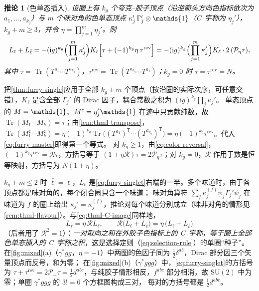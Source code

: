 \documentclass[UTF8,a4paper,11pt,fontset=fandol]{ctexart}
\makeatletter
\let\amsmathbb\mathbb
\renewcommand{\mathbb}[1]{\ifx1#1\mathds{1}\else\amsmathbb{#1}\fi}
\theoremstyle{cplain}
\newtheorem{corollary}[theorem]{推论}
\theoremstyle{cdefinition}
\theoremstyle{cremark}
\renewcommand{\proofname}{证明}
\renewenvironment{proof}[1][\proofname]{\par\pushQED{\qed}\normalfont\topsep6\p@\@plus6\p@\relax
  \trivlist\item[\hskip\labelsep\itshape #1\hspace{0.5em}]\ignorespaces}{\popQED\endtrivlist\@endpefalse}
\numberwithin{equation}{section}
\DeclareMathOperator{\Tr}{Tr}
\newcommand{\tp}{\mathsf{T}}                         %
\newcommand{\Rop}{\mathcal{R}}                       %
\newcommand{\Pm}{\mathcal{P}_{-}}                    %
\newcommand{\ii}{\mathrm{i}}                        %
\makeatother
\begin{document}
\begin{corollary}[色单态插入]\label{cor:singlet}
设圈上有 $k_g$ 个夸克--胶子顶点（沿逆箭头方向色指标依次为 $a_1,\dots,a_{k_g}$）与 $m$ 个味对角的色单态顶点
$\kappa_j'\,\Gamma_j'\otimes\mathbb 1$（C~宇称为 $\eta_j'$），$k_g+m\ge3$，并令 $\eta=\prod_{j=1}^m\eta_j'$。则
\begin{equation}\label{eq:furry-singlet}
L_\ell+L_{\bar\ell}=-(\ii g)^{k_g}\Bigl(\prod_{j=1}^m\kappa'_j\Bigr)K_\ell\Bigl[\tau+(-1)^{k_g}\eta\,\tau^{\mathrm{rev}}\Bigr]
=-(\ii g)^{k_g}\Bigl(\prod_{j=1}^m\kappa'_j\Bigr)K_\ell\cdot2\,(\mathcal P_\eta\tau),
\end{equation}
其中 $\tau=\Tr(T^{a_1}\cdots T^{a_{k_g}})$，$\tau^{\mathrm{rev}}=\Tr(T^{a_{k_g}}\cdots T^{a_1})$；$k_g=0$ 时 $\tau=\tau^{\mathrm{rev}}=N$。
\end{corollary}

\begin{proof}
把\cref{thm:furry-single}应用于全部 $k_g+m$ 个顶点（按沿圈的实际次序，可任意交错），$K_\ell$ 是含全部 $\Gamma_j'$ 的 Dirac 因子，耦合常数之积为 $(\ii g)^{k_g}\prod_j\kappa_j'$。
单态顶点的 $M=\mathbb 1$、$M^{\mathsf c}=\eta_j'\mathbb 1$ 在迹中只贡献纯数，故 $\Tr(M_1\cdots M_k)=\tau$；由\cref{lem:thmI-transpose}，
$\Tr(M_1^{\mathsf c}\cdots M_k^{\mathsf c})=\eta(-1)^{k_g}\Tr\bigl((T^{a_1})^{\tp}\cdots(T^{a_{k_g}})^{\tp}\bigr)=\eta(-1)^{k_g}\tau^{\mathrm{rev}}$。代入\cref{eq:furry-master}即得第一个等式。
对 $k_g\ge1$，由\cref{eq:color-reversal}，$(-1)^{k_g}\tau^{\mathrm{rev}}=\Rop\tau$，方括号等于 $(1+\eta\Rop)\tau=2\mathcal P_\eta\tau$；对 $k_g=0$，$\Rop$ 作用于数是恒等映射，方括号为 $N(1+\eta)$。
\end{proof}

$k_g+m\le2$ 时 $\bar\ell=\ell$，$L_\ell$ 是\cref{eq:furry-singlet}右端的一半。多个味道时，由于各顶点都是味对角的，每个闭合圈只含一个味道；
味对角算符 $\sum_f\kappa_j^{(f)}\bar\psi_f\Gamma_j'\psi_f$ 在味道为 $f$ 的圈上给出 $\kappa_j'=\kappa_j^{(f)}$，推论对每个味道分别成立（味非对角的情形见\cref{rem:thmI-flavour}）。与\cref{eq:thmI-C-image}同样地，
\begin{equation}\label{eq:thmI-C-image-singlet}
L_{\bar\ell}=\eta\,\Rop L_\ell ,\qquad \Rop\bigl(L_\ell+L_{\bar\ell}\bigr)=\eta\,\bigl(L_\ell+L_{\bar\ell}\bigr)
\end{equation}
（后者用了 $\Rop^2=1$）：\emph{一对取向之和在外胶子色指标上的 \textup{C}~宇称，等于圈上全部色单态插入的 \textup{C}~宇称之积}，这是选择定则（\cref{eq:selection-rule}）的单圈“种子”。
在\cref{fig:mixed}(a)（$\gamma^*gg$，$\eta=-1$）中两图的色因子同为 $\frac12\delta^{ab}$，Dirac 部分因三个矢量顶点而反号，和为零；
在\cref{fig:mixed}(b)（$\gamma^*ggg$）中，\cref{eq:furry-singlet}的方括号为 $\tau+\tau^{\mathrm{rev}}=2\Pm\tau=\frac12d^{abc}$，与纯胶子情形相反，$f^{abc}$ 部分相消，故 $\mathrm{SU}(2)$ 中为零；单圈 $\gamma^*ggg$ 的 $3!=6$ 个方框图构成三对，
每对的方括号都是 $\frac12d^{abc}$。
\end{document}

